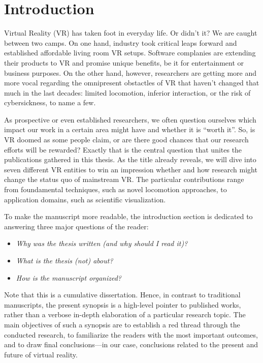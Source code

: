 %
\chapter{Introduction}
\label{sec:intro}



Virtual Reality (VR) has taken foot in everyday life. Or didn't it? We are caught between two camps. On one hand, industry took critical leaps forward and established affordable living room VR setups. Software complanies are extending their products to VR and promise unique benefits, be it for entertainment or business purposes. On the other hand, however, researchers are getting more and more vocal  regarding the omnipresent obstactles of VR that haven't changed that much in the last decades: limited locomotion, inferior interaction, or the risk of cybersickness, to name a few.





As prospective or even established researchers, we often question ourselves which impact our work in a certain area might have and whether it is ``worth it''. So, is VR doomed as some people claim, or are there good chances that our research efforts will be rewarded? Exactly that is the central question that unites the publications gathered in this thesis. As the title already reveals, we will dive into seven different VR entities to win an impression whether and how research might change the status quo of mainstream VR. The particular contributions range from foundamental techniques, such as novel locomotion approaches, to application domains, such as scientific visualization. 

To make the manuscript more readable, the introduction section is dedicated to answering three major questions of the reader: 
\begin{itemize}[noitemsep]
\item \textit{Why was the thesis written (and why should I read it)?}
\item \textit{What is the thesis (not) about?}
\item \textit{How is the manuscript organized?}
\end{itemize}
Note that this is a cumulative dissertation. Hence, in contrast to traditional manuscripts, the present synopsis is a high-level pointer to published works, rather than a verbose in-depth elaboration of a particular research topic. The main objectives of such a synopsis are to establish a red thread through the conducted research, to familiarize the readers with the most important outcomes, and to draw final conclusions---in our case, conclusions related to the present and future of virtual reality.






